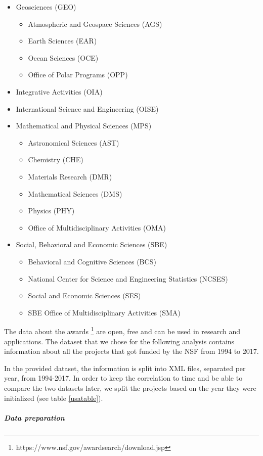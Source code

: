 \documentclass[12pt]{report}
\begin{document}
\begin{itemize}
\item Geosciences (GEO)
\begin{itemize}
\item[] Atmospheric and Geospace Sciences (AGS)
\item[] Earth Sciences (EAR)
\item[] Ocean Sciences (OCE)
\item[] Office of Polar Programs (OPP)
\end{itemize}
\item Integrative Activities (OIA)
\item International Science and Engineering (OISE)
\item Mathematical and Physical Sciences (MPS)
\begin{itemize}
\item[] Astronomical Sciences (AST)
\item[] Chemistry (CHE)
\item[] Materials Research (DMR)
\item[] Mathematical Sciences (DMS)
\item[] Physics (PHY)
\item[] Office of Multidisciplinary Activities (OMA)
\end{itemize}
\item Social, Behavioral and Economic Sciences (SBE)
\begin{itemize}
\item[] Behavioral and Cognitive Sciences (BCS)
\item[] National Center for Science and Engineering Statistics (NCSES)
\item[] Social and Economic Sciences (SES)
\item[] SBE Office of Multidisciplinary Activities (SMA)
\end{itemize}
\end{itemize}
The data about the awards
\footnote{https://www.nsf.gov/awardsearch/download.jsp} are open, free and can
be used in research and applications. The dataset that we chose for the
following analysis contains information about all the projects that got funded
by the NSF from 1994 to 2017.
 
In the provided dataset, the information is split into XML files, separated
per year, from 1994-2017. In order to keep the correlation to time and be able
to compare the two datasets later, we split the projects based on the year
they were initialized (see table \ref{usatable}).


\subparagraph{Data preparation}
\end{document}
